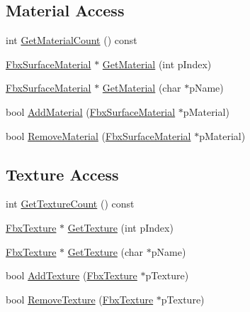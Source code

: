 \subsection*{Material Access}
\begin{DoxyCompactItemize}
\item 
int \hyperlink{class_fbx_scene_a098bcfeab04d64d1b7f900a09c09f381}{Get\+Material\+Count} () const
\item 
\hyperlink{class_fbx_surface_material}{Fbx\+Surface\+Material} $\ast$ \hyperlink{class_fbx_scene_aec766862a775be507f785d75ddc55cf5}{Get\+Material} (int p\+Index)
\item 
\hyperlink{class_fbx_surface_material}{Fbx\+Surface\+Material} $\ast$ \hyperlink{class_fbx_scene_ad99587afc86a025c65fd150dcdbf885b}{Get\+Material} (char $\ast$p\+Name)
\item 
bool \hyperlink{class_fbx_scene_a65586b64256e236b0e0f2d885ca985e2}{Add\+Material} (\hyperlink{class_fbx_surface_material}{Fbx\+Surface\+Material} $\ast$p\+Material)
\item 
bool \hyperlink{class_fbx_scene_a901ad0c4394b3ee5bf675ee91e54adc0}{Remove\+Material} (\hyperlink{class_fbx_surface_material}{Fbx\+Surface\+Material} $\ast$p\+Material)
\end{DoxyCompactItemize}
\subsection*{Texture Access}
\begin{DoxyCompactItemize}
\item 
int \hyperlink{class_fbx_scene_a63041ec5c2a3f563c999ee1c20c71071}{Get\+Texture\+Count} () const
\item 
\hyperlink{class_fbx_texture}{Fbx\+Texture} $\ast$ \hyperlink{class_fbx_scene_a0636380a7984fd690eb37720b5cc4f9a}{Get\+Texture} (int p\+Index)
\item 
\hyperlink{class_fbx_texture}{Fbx\+Texture} $\ast$ \hyperlink{class_fbx_scene_ab7f5f7902a4a43b5c8688a590448e70c}{Get\+Texture} (char $\ast$p\+Name)
\item 
bool \hyperlink{class_fbx_scene_a19321c754cefd2a1576477d8e8353472}{Add\+Texture} (\hyperlink{class_fbx_texture}{Fbx\+Texture} $\ast$p\+Texture)
\item 
bool \hyperlink{class_fbx_scene_af802f5395ba0fcb72f13f2734ad17332}{Remove\+Texture} (\hyperlink{class_fbx_texture}{Fbx\+Texture} $\ast$p\+Texture)
\end{DoxyCompactItemize}
